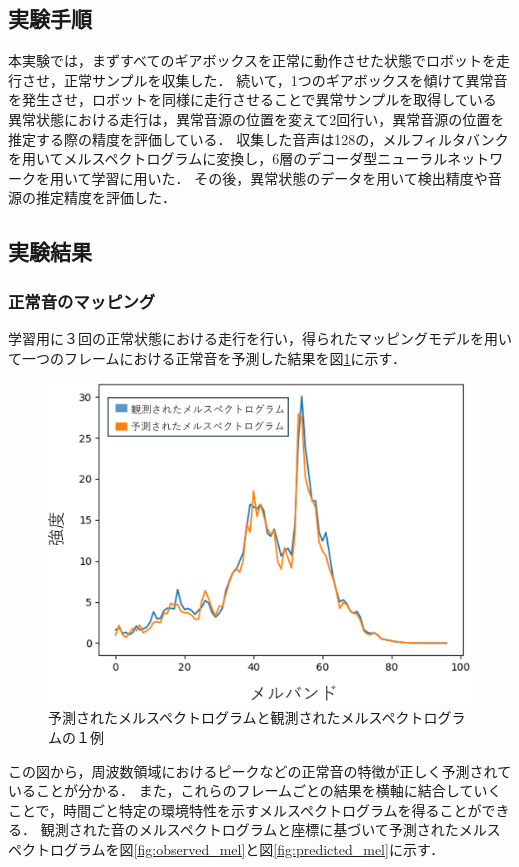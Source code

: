 \documentclass[../main]{subfiles}
\begin{document}
\subsection{実験手順} \label{subsec:experiment_procedure}

本実験では，まずすべてのギアボックスを正常に動作させた状態でロボットを走行させ，正常サンプルを収集した．
続いて，1つのギアボックスを傾けて異常音を発生させ，ロボットを同様に走行させることで異常サンプルを取得している
異常状態における走行は，異常音源の位置を変えて2回行い，異常音源の位置を推定する際の精度を評価している．
収集した音声は128の，メルフィルタバンクを用いてメルスペクトログラムに変換し，6層のデコーダ型ニューラルネットワークを用いて学習に用いた．
その後，異常状態のデータを用いて検出精度や音源の推定精度を評価した．


\subsection{実験結果} \label{subsec:vexp_ref_result}

\subsubsection{正常音のマッピング} \label{subsubsec:normal_mapping}
学習用に３回の正常状態における走行を行い，得られたマッピングモデルを用いて一つのフレームにおける正常音を予測した結果を図\ref{fig:comparison_pre_mel}に示す．


\begin{figure}[t]
  \centering
  \includegraphics[keepaspectratio, width=0.7\linewidth]{chap4/comparison_pre_mel.png}
  \caption{予測されたメルスペクトログラムと観測されたメルスペクトログラムの１例}
  \label{fig:comparison_pre_mel}
\end{figure}

この図から，周波数領域におけるピークなどの正常音の特徴が正しく予測されていることが分かる．
また，これらのフレームごとの結果を横軸に結合していくことで，時間ごと特定の環境特性を示すメルスペクトログラムを得ることができる．
観測された音のメルスペクトログラムと座標に基づいて予測されたメルスペクトログラムを図\ref{fig:observed_mel}と図\ref{fig:predicted_mel}に示す．
\end{document}
